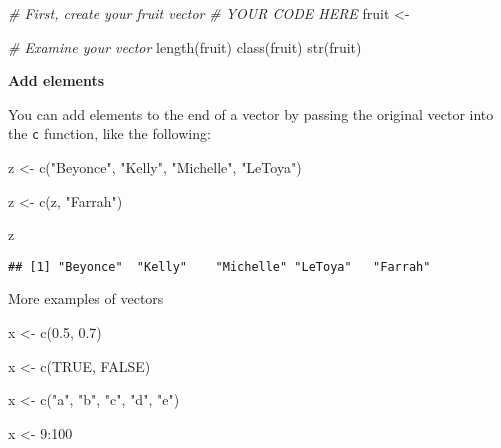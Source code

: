 \documentclass[
]{book}
\newenvironment{Shaded}{\begin{snugshade}}{\end{snugshade}}
\newcommand{\CommentTok}[1]{\textcolor[rgb]{0.56,0.35,0.01}{\textit{#1}}}
\newcommand{\ConstantTok}[1]{\textcolor[rgb]{0.00,0.00,0.00}{#1}}
\newcommand{\DecValTok}[1]{\textcolor[rgb]{0.00,0.00,0.81}{#1}}
\newcommand{\FloatTok}[1]{\textcolor[rgb]{0.00,0.00,0.81}{#1}}
\newcommand{\FunctionTok}[1]{\textcolor[rgb]{0.00,0.00,0.00}{#1}}
\newcommand{\NormalTok}[1]{#1}
\newcommand{\OtherTok}[1]{\textcolor[rgb]{0.56,0.35,0.01}{#1}}
\newcommand{\SpecialCharTok}[1]{\textcolor[rgb]{0.00,0.00,0.00}{#1}}
\newcommand{\StringTok}[1]{\textcolor[rgb]{0.31,0.60,0.02}{#1}}
\begin{document}
\begin{Shaded}
\begin{Highlighting}[]
\CommentTok{\# First, create your fruit vector}
\CommentTok{\# YOUR CODE HERE}
\NormalTok{fruit }\OtherTok{\textless{}{-}}

  \CommentTok{\# Examine your vector}
  \FunctionTok{length}\NormalTok{(fruit)}
\FunctionTok{class}\NormalTok{(fruit)}
\FunctionTok{str}\NormalTok{(fruit)}
\end{Highlighting}
\end{Shaded}

\textbf{Add elements}

You can add elements to the end of a vector by passing the original vector into the \texttt{c} function, like the following:

\begin{Shaded}
\begin{Highlighting}[]
\NormalTok{z }\OtherTok{\textless{}{-}} \FunctionTok{c}\NormalTok{(}\StringTok{"Beyonce"}\NormalTok{, }\StringTok{"Kelly"}\NormalTok{, }\StringTok{"Michelle"}\NormalTok{, }\StringTok{"LeToya"}\NormalTok{)}

\NormalTok{z }\OtherTok{\textless{}{-}} \FunctionTok{c}\NormalTok{(z, }\StringTok{"Farrah"}\NormalTok{)}

\NormalTok{z}
\end{Highlighting}
\end{Shaded}

\begin{verbatim}
## [1] "Beyonce"  "Kelly"    "Michelle" "LeToya"   "Farrah"
\end{verbatim}

More examples of vectors

\begin{Shaded}
\begin{Highlighting}[]
\NormalTok{x }\OtherTok{\textless{}{-}} \FunctionTok{c}\NormalTok{(}\FloatTok{0.5}\NormalTok{, }\FloatTok{0.7}\NormalTok{)}

\NormalTok{x }\OtherTok{\textless{}{-}} \FunctionTok{c}\NormalTok{(}\ConstantTok{TRUE}\NormalTok{, }\ConstantTok{FALSE}\NormalTok{)}

\NormalTok{x }\OtherTok{\textless{}{-}} \FunctionTok{c}\NormalTok{(}\StringTok{"a"}\NormalTok{, }\StringTok{"b"}\NormalTok{, }\StringTok{"c"}\NormalTok{, }\StringTok{"d"}\NormalTok{, }\StringTok{"e"}\NormalTok{)}

\NormalTok{x }\OtherTok{\textless{}{-}} \DecValTok{9}\SpecialCharTok{:}\DecValTok{100}
\end{Highlighting}
\end{Shaded}
\end{document}
